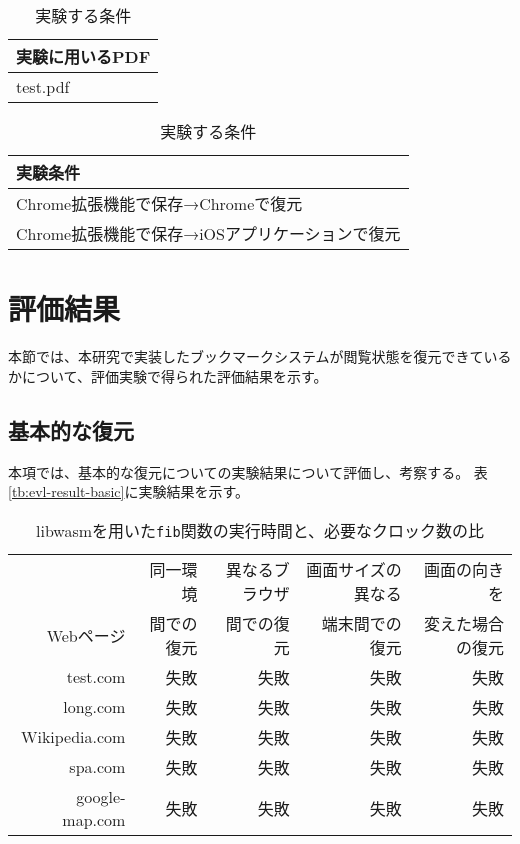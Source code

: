 \begin{table}[htbp]
  \label{tb:evl-pdf-list}
  \caption{実験する条件}
  \begin{center}
    \begin{tabular}{|l|}
    \hline
    実験に用いるPDF  \\ \hline
    test.pdf \\ \hline
    \end{tabular}
  \end{center}
\end{table}

\begin{table}[htbp]
  \label{tb:evl-pdf-conditions}
  \caption{実験する条件}
  \begin{center}
    \begin{tabular}{|l|}
    \hline
    実験条件  \\ \hline
    Chrome拡張機能で保存→Chromeで復元 \\ \hline
    Chrome拡張機能で保存→iOSアプリケーションで復元 \\ \hline
    \end{tabular}
  \end{center}
\end{table}

\section{評価結果}
本節では、本研究で実装したブックマークシステムが閲覧状態を復元できているかについて、評価実験で得られた評価結果を示す。

\subsection{基本的な復元}
本項では、基本的な復元についての実験結果について評価し、考察する。
表\ref{tb:evl-result-basic}に実験結果を示す。

\begin{table}[htbp]
  \caption{libwasmを用いた{\tt fib}関数の実行時間と、必要なクロック数の比}
  \label{tab:evl-result-basic}
  \begin{center}
    \begin{tabular}{rrrrr}
      \hline
      & 同一環境 & 異なるブラウザ & 画面サイズの異なる &  画面の向きを \\
       Webページ & 間での復元 & 間での復元 & 端末間での復元 & 変えた場合の復元 \\ \hline \hline
      test.com & 失敗 & 失敗 &  失敗 & 失敗 \\ \hline
      long.com & 失敗 & 失敗 &  失敗 & 失敗 \\ \hline
      Wikipedia.com & 失敗 & 失敗 &  失敗 & 失敗 \\ \hline
      spa.com & 失敗 & 失敗 &  失敗 & 失敗 \\ \hline
      google-map.com & 失敗 & 失敗 &  失敗 & 失敗 \\ \hline
    \end{tabular}
  \end{center}
\end{table}

